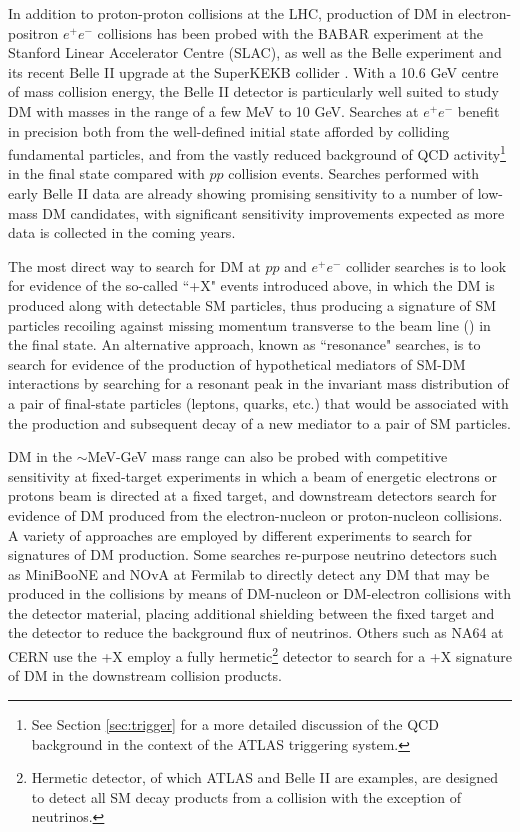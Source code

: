 In addition to proton-proton collisions at the LHC, production of DM in electron-positron \(e^+e^-\) collisions has been probed with the BABAR experiment \cite{babar_2002,babar_dm_2020} at the Stanford Linear Accelerator Centre (SLAC), as well as the Belle experiment \cite{belle_detector_2002} and its recent Belle II upgrade \cite{Robertson_2019} at the SuperKEKB collider \cite{superkekb_2018}. With a 10.6 GeV centre of mass collision energy, the Belle II detector is particularly well suited to study DM with masses in the range of a few MeV to 10 GeV. Searches at \(e^+e^-\) benefit in precision both from the well-defined initial state afforded by colliding fundamental particles, and from the vastly reduced background of QCD activity\footnote{See Section \ref{sec:trigger} for a more detailed discussion of the QCD background in the context of the ATLAS triggering system.} in the final state compared with \(pp\) collision events. Searches performed with early Belle II data \cite{Campajola_2021} are already showing promising sensitivity to a number of low-mass DM candidates, with significant sensitivity improvements expected as more data is collected in the coming years.

The most direct way to search for DM at \(pp\) and \(e^+e^-\) collider searches is to look for evidence of the so-called ``\met+X" events introduced above, in which the DM is produced along with detectable SM particles, thus producing a signature of SM particles recoiling against missing momentum transverse to the beam line (\met) in the final state. An alternative approach, known as ``resonance" searches, is to search for evidence of the production of hypothetical mediators of SM-DM interactions by searching for a resonant peak in the invariant mass distribution of a pair of final-state particles (leptons, quarks, etc.) that would be associated with the production and subsequent decay of a new mediator to a pair of SM particles.

DM in the \(\sim\)MeV-GeV mass range can also be probed with competitive sensitivity at fixed-target experiments in which a beam of energetic electrons or protons beam is directed at a fixed target, and downstream detectors search for evidence of DM produced from the electron-nucleon or proton-nucleon collisions. A variety of approaches are employed by different experiments to search for signatures of DM production. Some searches re-purpose neutrino detectors such as MiniBooNE \cite{miniboone_2018} and NOvA \cite{nova_2017} at Fermilab to directly detect any DM that may be produced in the collisions by means of DM-nucleon or DM-electron collisions with the detector material, placing additional shielding between the fixed target and the detector to reduce the background flux of neutrinos. Others such as NA64 \cite{na64_2019} at CERN use the \met+X employ a fully hermetic\footnote{Hermetic detector, of which ATLAS and Belle II are examples, are designed to detect all SM decay products from a collision with the exception of neutrinos.} detector to search for a \met+X signature of DM in the downstream collision products.

